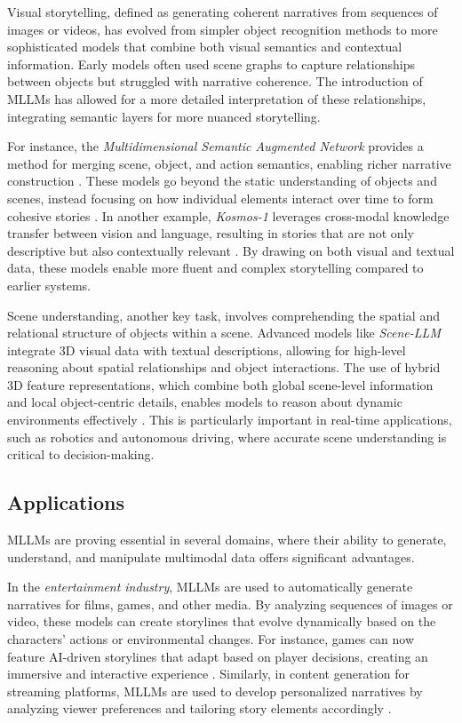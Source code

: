 \documentclass{article}
\begin{document}
Visual storytelling, defined as generating coherent narratives from sequences of images or videos, has evolved from simpler object recognition methods to more sophisticated models that combine both visual semantics and contextual information. Early models often used scene graphs to capture relationships between objects but struggled with narrative coherence. The introduction of MLLMs has allowed for a more detailed interpretation of these relationships, integrating semantic layers for more nuanced storytelling.

For instance, the \textit{Multidimensional Semantic Augmented Network} provides a method for merging scene, object, and action semantics, enabling richer narrative construction \cite{vs2024li}. These models go beyond the static understanding of objects and scenes, instead focusing on how individual elements interact over time to form cohesive stories \cite{vs2024li}. In another example, \textit{Kosmos-1} leverages cross-modal knowledge transfer between vision and language, resulting in stories that are not only descriptive but also contextually relevant \cite{vs2024song}. By drawing on both visual and textual data, these models enable more fluent and complex storytelling compared to earlier systems.

Scene understanding, another key task, involves comprehending the spatial and relational structure of objects within a scene. Advanced models like \textit{Scene-LLM} integrate 3D visual data with textual descriptions, allowing for high-level reasoning about spatial relationships and object interactions. The use of hybrid 3D feature representations, which combine both global scene-level information and local object-centric details, enables models to reason about dynamic environments effectively \cite{vs2024rao}. This is particularly important in real-time applications, such as robotics and autonomous driving, where accurate scene understanding is critical to decision-making.

\subsection{Applications}

MLLMs are proving essential in several domains, where their ability to generate, understand, and manipulate multimodal data offers significant advantages.

In the \textit{entertainment industry}, MLLMs are used to automatically generate narratives for films, games, and other media. By analyzing sequences of images or video, these models can create storylines that evolve dynamically based on the characters' actions or environmental changes. For instance, games can now feature AI-driven storylines that adapt based on player decisions, creating an immersive and interactive experience \cite{vs2020parde}. Similarly, in content generation for streaming platforms, MLLMs are used to develop personalized narratives by analyzing viewer preferences and tailoring story elements accordingly \cite{vs2024song}.
\end{document}
